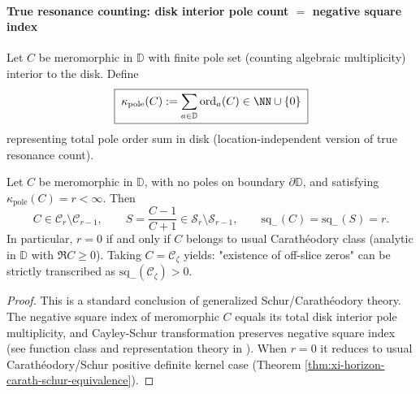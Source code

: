 \paragraph{True resonance counting: disk interior pole count \texorpdfstring{$=$}{=} negative square index}
Let \(C\) be meromorphic in \(\mathbb{D}\) with finite pole set (counting algebraic multiplicity) interior to the disk.
Define
\begin{equation}\label{eq:xi-polecount-kappa}
\boxed{\;
\kappa_{\mathrm{pole}}(C):=\sum_{a\in\mathbb{D}}\operatorname{ord}_{a}(C)\in\NN\cup\{0\}\;}
\end{equation}
representing total pole order sum in disk (location-independent version of true resonance count).

\begin{theorem}\label{thm:xi-poles-negative-squares-equivalence}
Let \(C\) be meromorphic in \(\mathbb{D}\), with no poles on boundary \(\partial\mathbb{D}\), and satisfying \(\kappa_{\mathrm{pole}}(C)=r<\infty\).
Then
\[
C\in\mathcal{C}_{r}\setminus\mathcal{C}_{r-1},
\qquad
S=\frac{C-1}{C+1}\in\mathcal{S}_{r}\setminus\mathcal{S}_{r-1},
\qquad
\mathrm{sq}_-(C)=\mathrm{sq}_-(S)=r.
\]
In particular, \(r=0\) if and only if \(C\) belongs to usual Carathéodory class (analytic in \(\mathbb{D}\) with \(\Re C\ge 0\)).
Taking \(C=\mathscr{C}_{\zeta}\) yields: "existence of off-slice zeros" can be strictly transcribed as \(\mathrm{sq}_-(\mathscr{C}_{\zeta})>0\).
\end{theorem}

\begin{proof}
This is a standard conclusion of generalized Schur/Carathéodory theory. The negative square index of meromorphic \(C\) equals its total disk interior pole multiplicity,
and Cayley-Schur transformation preserves negative square index (see function class and representation theory in \cite{KreinLanger1977ExtensionPiKappaI,AlpayDijksmaRovnyakDeSnoo1997SchurPontryagin}).
When \(r=0\) it reduces to usual Carathéodory/Schur positive definite kernel case (Theorem \ref{thm:xi-horizon-carath-schur-equivalence}).
\end{proof}

